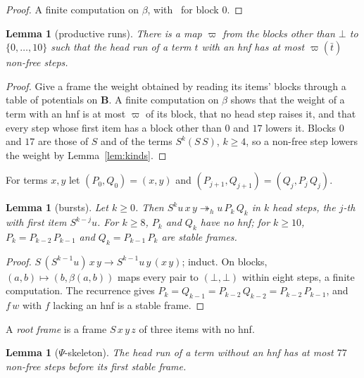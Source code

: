 \documentclass[11pt]{amsart}
\newtheorem{lemma}[theorem]{Lemma}
\theoremstyle{definition}
\newcommand{\B}{\mathbf B}
\newcommand{\hred}{\twoheadrightarrow_h}
\begin{document}
\begin{proof}
A finite computation on $\beta$, with~\citep{s1} for block $0$.
\end{proof}

\begin{lemma}[productive runs]\label{lem:productive}
There is a map $\varpi$ from the blocks other than $\bot$ to $\{0,\dots,10\}$ such that the head run of
a term $t$ with an hnf has at most $\varpi(\bar t)$ non-free steps.
\end{lemma}

\begin{proof}
Give a frame the weight obtained by reading its items' blocks through a table of potentials on $\B$.
A finite computation on $\beta$ shows that the weight of a term with an hnf is at most $\varpi$ of its
block, that no head step raises it, and that every step whose first item has a block other than $0$
and $17$ lowers it. Blocks $0$ and $17$ are those of $S$ and of the terms $S^k(S\,S)$, $k\ge4$, so a
non-free step lowers the weight by Lemma~\ref{lem:kinds}.
\end{proof}

For terms $x,y$ let $(P_0,Q_0)=(x,y)$ and $(P_{j+1},Q_{j+1})=(Q_j,P_j\,Q_j)$.

\begin{lemma}[bursts]\label{lem:burst}
Let $k\ge0$. Then $S^k u\,x\,y\hred u\,P_k\,Q_k$ in $k$ head steps, the $j$-th with first item
$S^{k-j}u$. For $k\ge8$, $P_k$ and $Q_k$ have no hnf; for $k\ge10$, $P_k=P_{k-2}\,P_{k-1}$ and
$Q_k=P_{k-1}\,P_k$ are stable frames.
\end{lemma}

\begin{proof}
$S\,(S^{k-1}u)\,x\,y\to S^{k-1}u\,y\,(x\,y)$; induct. On blocks, $(a,b)\mapsto(b,\beta(a,b))$ maps
every pair to $(\bot,\bot)$ within eight steps, a finite computation. The recurrence gives
$P_k=Q_{k-1}=P_{k-2}\,Q_{k-2}=P_{k-2}\,P_{k-1}$, and $f\,w$ with $f$ lacking an hnf is a stable frame.
\end{proof}

A \emph{root frame} is a frame $S\,x\,y\,z$ of three items with no hnf.

\begin{lemma}[$\Psi$-skeleton]\label{lem:psiskel}
The head run of a term without an hnf has at most $77$ non-free steps before its first stable frame.
\end{lemma}
\end{document}
